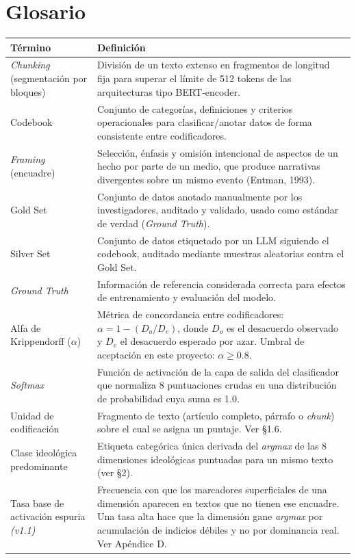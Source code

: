 \documentclass[11pt,letterpaper]{article}
\begin{document}
\section{Glosario}
\begin{longtable}{@{}p{4.3cm}p{11.1cm}@{}}
\toprule \textbf{Término} & \textbf{Definición}\\ \midrule\endhead
\emph{Chunking} (segmentación por bloques) & División de un texto extenso en fragmentos de longitud fija
para superar el límite de 512 tokens de las arquitecturas tipo BERT-encoder.\\
\addlinespace
Codebook & Conjunto de categorías, definiciones y criterios operacionales para clasificar/anotar datos de
forma consistente entre codificadores.\\
\addlinespace
\emph{Framing} (encuadre) & Selección, énfasis y omisión intencional de aspectos de un hecho por parte de un
medio, que produce narrativas divergentes sobre un mismo evento (Entman, 1993).\\
\addlinespace
Gold Set & Conjunto de datos anotado manualmente por los investigadores, auditado y validado, usado como
estándar de verdad (\emph{Ground Truth}).\\
\addlinespace
Silver Set & Conjunto de datos etiquetado por un LLM siguiendo el codebook, auditado mediante muestras
aleatorias contra el Gold Set.\\
\addlinespace
\emph{Ground Truth} & Información de referencia considerada correcta para efectos de entrenamiento y
evaluación del modelo.\\
\addlinespace
Alfa de Krippendorff ($\alpha$) & Métrica de concordancia entre codificadores:
$\alpha = 1 - (D_o / D_e)$, donde $D_o$ es el desacuerdo observado y $D_e$ el desacuerdo esperado por azar.
Umbral de aceptación en este proyecto: $\alpha \geq 0.8$.\\
\addlinespace
\emph{Softmax} & Función de activación de la capa de salida del clasificador que normaliza 8 puntuaciones
crudas en una distribución de probabilidad cuya suma es 1.0.\\
\addlinespace
Unidad de codificación & Fragmento de texto (artículo completo, párrafo o \emph{chunk}) sobre el cual se
asigna un puntaje. Ver §1.6.\\
\addlinespace
Clase ideológica predominante & Etiqueta categórica única derivada del \emph{argmax} de las 8 dimensiones
ideológicas puntuadas para un mismo texto (ver §2).\\
\addlinespace
Tasa base de activación espuria \emph{(v1.1)} & Frecuencia con que los marcadores superficiales de una
dimensión aparecen en textos que no tienen ese encuadre. Una tasa alta hace que la dimensión gane
\emph{argmax} por acumulación de indicios débiles y no por dominancia real. Ver Apéndice D.\\
\bottomrule
\end{longtable}
\end{document}
